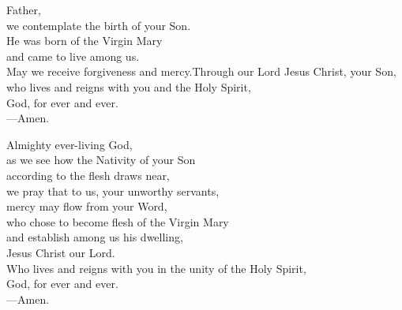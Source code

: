 \prayer


\begin{prayerverse}
Father,\\
we contemplate the birth of your Son.\\
He was born of the Virgin Mary\\
and came to live among us.\\
May we receive forgiveness and mercy.Through our Lord Jesus Christ, your Son, \\
who lives and reigns with you and the Holy Spirit, \\
God, for ever and ever.\\
{\color{red}---\thinspace}Amen.
\end{prayerverse}


\begin{prayerverse}
Almighty ever-living God,\\
as we see how the Nativity of your Son\\
according to the flesh draws near,\\
we pray that to us, your unworthy servants,\\
mercy may flow from your Word,\\
who chose to become flesh of the Virgin Mary\\
and establish among us his dwelling,\\
Jesus Christ our Lord.\\
Who lives and reigns with you in the unity of the Holy Spirit,\\
God, for ever and ever.\\
{\color{red}---\thinspace}Amen.

\end{prayerverse}

